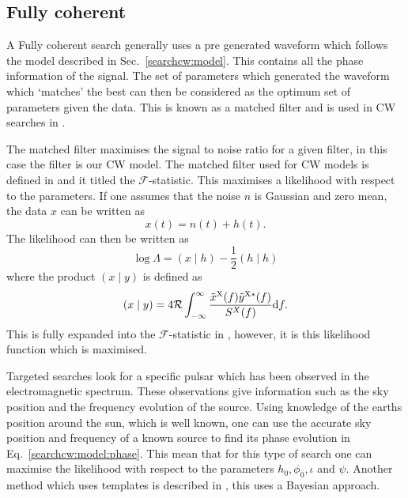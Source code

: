 \subsection{\label{searchcw:search:coherent}Fully coherent}

A Fully coherent search generally uses a pre generated waveform which follows the model described in Sec.~\ref{searchcw:model}. 
This contains all the phase information of the signal.
The set of parameters which generated the waveform which `matches' the best can then be considered as the optimum set of parameters given the data.
This is known as a matched filter \citep{} and is used in \gls{CW} searches in \citep{dupuis2005BayesianEstimation,}.

The matched filter maximises the signal to noise ratio for a given filter, in this case the filter is our \gls{CW} model. 
The matched filter used for \gls{CW} models is defined in \citep{prix2007SearchContinuous} and it titled the $\mathcal{F}$-statistic. 
This maximises a likelihood with respect to the parameters.
If one assumes that the noise $n$ is Gaussian and zero mean, the data $x$ can be written as
\begin{equation}
		x(t) = n(t) + h(t).
\end{equation}
The likelihood can then be written as
\begin{equation}
		\log \Lambda = \left( x \mid h \right) - \frac{1}{2} \left( h \mid h\right) 
\end{equation}
where the product $(x \mid y)$ is defined as
\begin{equation}
		\left( x \mid y \right) = 4 \mathcal{R} \int^{\infty}_{-\infty}  \frac{\tilde{x}^{{\rm X}}(f) \tilde{y}^{{\rm X *}}(f)  }{S^{X}(f)} \mathrm{d}f.
\end{equation}
This is fully expanded into the $\mathcal{F}$-statistic in \citep{schutz1998DataAnalysis}, however, it is this likelihood function which is maximised. 


Targeted searches look for a specific pulsar which has been observed in the electromagnetic spectrum.
These observations give information such as the sky position and the frequency evolution of the source.
Using knowledge of the earths position around the sun, which is well known, one can use the accurate sky position and frequency of a known source to find its phase evolution in Eq.~\ref{searchcw:model:phase}.
This mean that for this type of search one can maximise the likelihood with respect to the parameters  $h_0, \phi_0, \iota$ and $\psi$.
Another method which uses templates is described in \citep{dupuis2005BayesianEstimation}, this uses a Bayesian approach.

